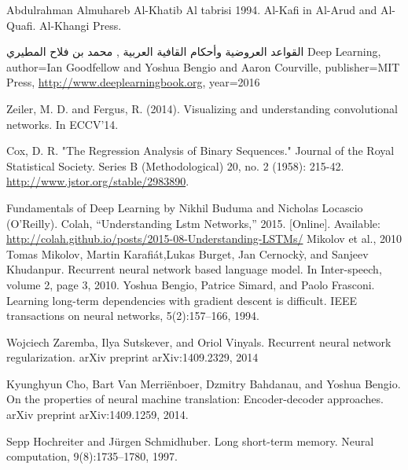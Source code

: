 \makeatletter
\renewcommand{\ps@plain}{%
\renewcommand\@oddhead{\hfil\normalfont\textrm{\thepage}}%
\renewcommand\@evenhead{}%
\renewcommand\@oddfoot{}%
\renewcommand\@evenfoot{}%
}
\makeatother
\pagestyle{myheadings}
\renewcommand\bibname{\uppercase{References}}
\begin{thebibliography}{999}
Abdulrahman Almuhareb
 Al-Khatib Al tabrisi 1994. Al-Kafi in Al-Arud and Al-Quafi. Al-Khangi Press.
 

    
 القواعد العروضية وأحكام القافية العربية , محمد بن فلاح المطيري
 Deep Learning,
    author={Ian Goodfellow and Yoshua Bengio and Aaron Courville},
    publisher={MIT Press},
    \url{http://www.deeplearningbook.org},
    year={2016}

     Zeiler, M. D. and Fergus, R. (2014). Visualizing and understanding convolutional networks. In ECCV’14.

       Cox, D. R. "The Regression Analysis of Binary Sequences." Journal of the Royal Statistical Society. Series B (Methodological) 20, no. 2 (1958): 215-42. \url{http://www.jstor.org/stable/2983890}.

Fundamentals of Deep Learning by Nikhil Buduma and Nicholas Locascio (O’Reilly).
 Colah, “Understanding Lstm Networks,” 2015. [Online]. Available: \url{http://colah.github.io/posts/2015-08-Understanding-LSTMs/}
 Mikolov et al., 2010 Tomas Mikolov, Martin Karafiát,Lukas Burget, Jan Cernockỳ, and Sanjeev Khudanpur. Recurrent neural network based language model. In Inter-speech, volume 2, page 3, 2010.
 Yoshua Bengio, Patrice Simard, and Paolo Frasconi. Learning long-term dependencies with gradient descent is difficult. IEEE transactions on neural networks, 5(2):157–166, 1994.

 Wojciech Zaremba, Ilya Sutskever, and Oriol Vinyals. Recurrent neural network regularization. arXiv preprint arXiv:1409.2329, 2014

 Kyunghyun Cho, Bart Van Merriënboer, Dzmitry Bahdanau, and Yoshua Bengio. On the properties of neural machine translation: Encoder-decoder approaches. arXiv preprint arXiv:1409.1259, 2014.

 Sepp Hochreiter and Jürgen Schmidhuber. Long short-term memory. Neural computation, 9(8):1735–1780, 1997.


\end{thebibliography}
